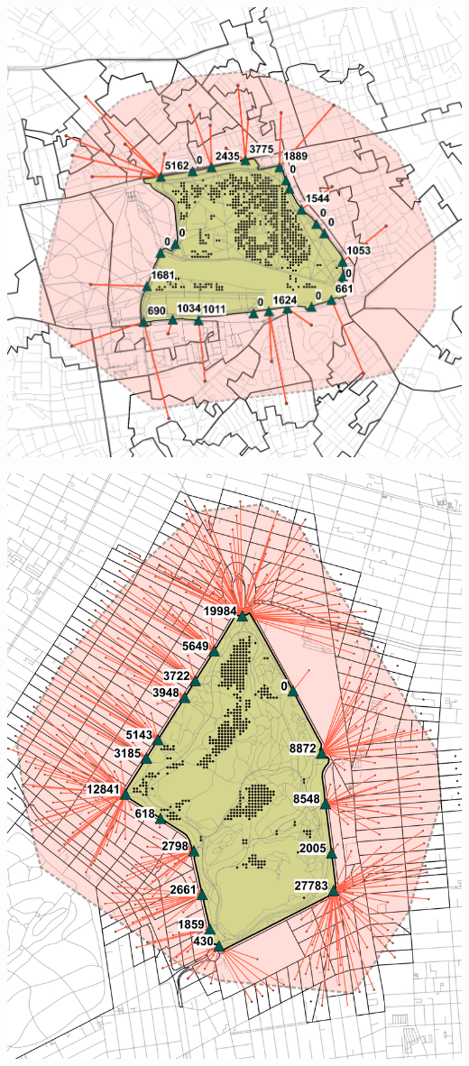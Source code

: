 \begin{multicols}{2}
\begin{minipage}{0.45\textwidth}
    \centering
    \includegraphics[width=\linewidth]{images/network/hyde_census_nearest.png}\par\hspace{3pt} 
    \includegraphics[width=\linewidth]{images/network/prospect_census_nearest.png}\par\hspace{3pt}

\end{minipage}
\end{multicols}
